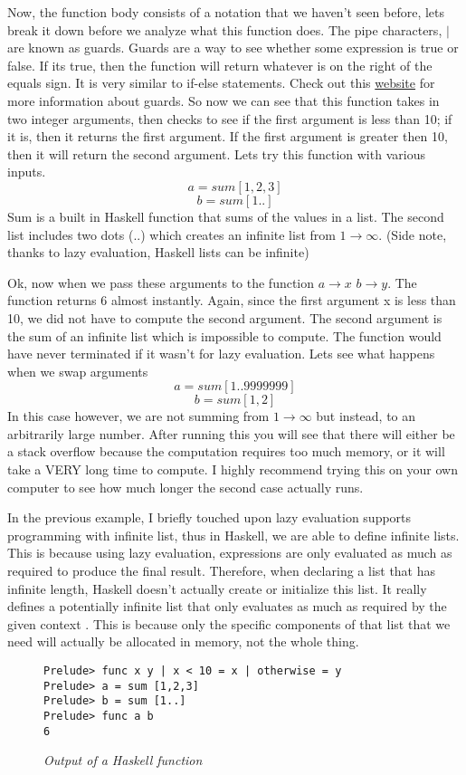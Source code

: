 \documentclass{article}
\begin{document}
\medskip\noindent
Now, the function body consists of a notation that we haven't seen before, lets break it down before we analyze what this function does. The pipe characters, $|$ are known as guards. Guards are a way to see whether some expression is true or false. If its true, then the function will return whatever is on the right of the equals sign. It is very similar to if-else statements. Check out this \href{http://learnyouahaskell.com/syntax-in-functions#guards-guards}{website} for more information about guards. So now we can see that this function takes in two integer arguments, then checks to see if the first argument is less than 10; if it is, then it returns the first argument. If the first argument is greater then 10, then it will return the second argument. Lets try this function with various inputs. $$a = sum [1,2,3]$$ $$b = sum [1..]$$ Sum is a built in Haskell function that sums of the values in a list. The second list includes two dots ($..$) which creates an infinite list from $1 \rightarrow \infty$. (Side note, thanks to lazy evaluation, Haskell lists can be infinite)

\medskip\noindent
Ok, now when we pass these arguments to the function $a \rightarrow x$  $b \rightarrow y$. The function returns 6 almost instantly. Again, since the first argument x is less than 10, we did not have to compute the second argument. The second argument is the sum of an infinite list which is impossible to compute. The function would have never terminated if it wasn't for lazy evaluation. Lets see what happens when we swap arguments $$a = sum [1..9999999]$$ $$b = sum [1,2]$$ In this case however, we are not summing from $1 \rightarrow \infty$ but instead, to an arbitrarily large number. After running this you will see that there will either be a stack overflow because the computation requires too much memory, or it will take a VERY long time to compute. I highly recommend trying this on your own computer to see how much longer the second case actually runs.

\medskip\noindent
In the previous example, I briefly touched upon lazy evaluation supports programming with infinite list, thus in Haskell, we are able to define infinite lists. This is because using lazy evaluation, expressions are only evaluated as much as required to produce the final result. Therefore, when declaring a list that has infinite length, Haskell doesn't actually create or initialize this list. It really defines a potentially infinite list that only evaluates as much as required by the given context \cite{GHutton}. This is because only the specific components of that list that we need will actually be allocated in memory, not the whole thing.
\begin{figure}[H]
    \begin{lstlisting}
Prelude> func x y | x < 10 = x | otherwise = y
Prelude> a = sum [1,2,3]
Prelude> b = sum [1..]
Prelude> func a b
6
    \end{lstlisting}
    \caption{\textit{Output of a Haskell function}}
\end{figure}
\end{document}
